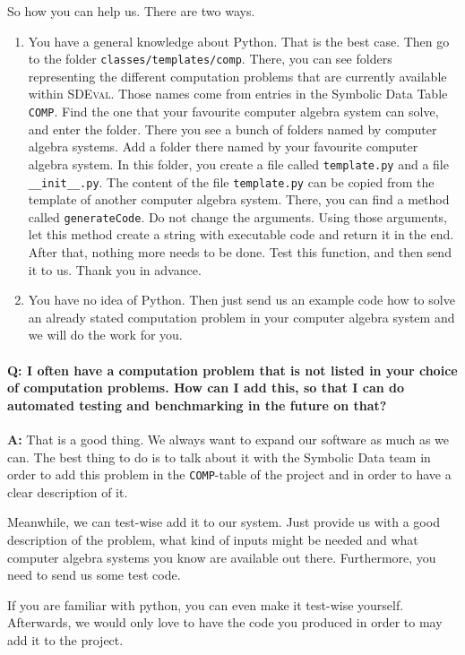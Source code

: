 \documentclass[11pt,a4paper]{amsart}
\numberwithin{equation}{section}
\theoremstyle{definition}
\begin{document}
So how you can help us. There are two ways.
\begin{enumerate}
  \item You have a general knowledge about Python. That is the best case. Then go to the folder \texttt{classes/templates/comp}. There, you can see folders representing the different computation problems that are currently available within \textsc{SDEval}. Those names come from entries in the Symbolic Data Table \texttt{COMP}. Find the one that your favourite computer algebra system can solve, and enter the folder. There you see a bunch of folders named by computer algebra systems. Add a folder there named by your favourite computer algebra system. In this folder, you create a file called \texttt{template.py} and a file \texttt{\_\_init\_\_.py}. The content of the file \texttt{template.py} can be copied from the template of another computer algebra system. There, you can find a method called \texttt{generateCode}. Do not change the arguments. Using those arguments, let this method create a string with executable code and return it in the end. After that, nothing more needs to be done. Test this function, and then send it to us. Thank you in advance.
\item You have no idea of Python. Then just send us an example code how to solve an already stated computation problem in your computer algebra system and we will do the work for you.
\end{enumerate}

\paragraph{\textbf{Q:} I often have a computation problem that is not listed in your choice of computation problems. How can I add this, so that I can do automated testing and benchmarking in the future on that?}
\textbf{A:} That is a good thing. We always want to expand our software as much as we can. The best thing to do is to talk about it with the Symbolic Data team in order to add this problem in the \texttt{COMP}-table of the project and in order to have a clear description of it. 

Meanwhile, we can test-wise add it to our system. Just provide us with a good description of the problem, what kind of inputs might be needed and what computer algebra systems you know are available out there. Furthermore, you need to send us some test code.

If you are familiar with python, you can even make it test-wise yourself. Afterwards, we would only love to have the code you produced in order to may add it to the project.
\end{document}
